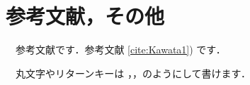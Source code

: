 
\section{参考文献，その他}
　参考文献\cite{Kawata1,Schaft1,Nakamura1}です．参考文献 \ref{cite:Kawata1}) です．

　丸文字やリターンキーは ，\returna，\returnb のようにして書けます．